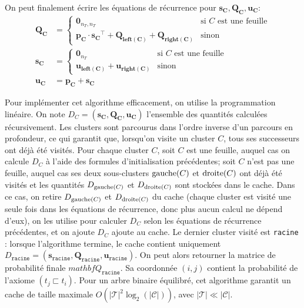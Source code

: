 On peut finalement écrire les équations de récurrence pour $\mathbf{s_C}, \mathbf{Q_C}, \mathbf{u_C}$:
\begin{align}
    \mathbf{Q_C} &=
    \begin{cases}
      \mathbf{0}_{n_T,n_T} & \text{si $C$ est une feuille}\\
      \mathbf{p_C} \cdot \mathbf{s_C}^\top + \mathbf{Q_\text{left$(C)$}} + \mathbf{Q_\text{right$(C)$}} & \text{sinon}
    \end{cases}  \\
  \mathbf{s_C} &=
    \begin{cases}
      \mathbf{0}_{n_T} & \text{si $C$ est une feuille}\\
      \mathbf{u_\text{left$(C)$}} + \mathbf{u_\text{right$(C)$}} & \text{sinon}
    \end{cases}  \\
    \mathbf{u_C} &= \mathbf{p_C} + \mathbf{s_C}
\end{align}

Pour implémenter cet algorithme efficacement, on utilise la programmation linéaire. On note $D_C = (\mathbf{s_C}, \mathbf{Q_C}, \mathbf{u_C})$ l'ensemble des quantités calculées récursivement. Les clusters sont parcourus dans l'ordre inverse d'un parcours en profondeur, ce qui garantit que, lorsqu'on visite un cluster $C$, tous ses successeurs ont déjà été visités. Pour chaque cluster $C$, soit $C$ est une feuille, auquel cas on calcule $D_C$ à l'aide des formules d'initialisation précédentes; soit $C$ n'est pas une feuille, auquel cas ses deux sous-clusters $\operatorname{gauche}(C)$ et $\operatorname{droite}(C)$ ont déjà été visités et les quantités $D_{\operatorname{gauche}(C)}$ et $D_{\operatorname{droite}(C)}$ sont stockées dans le cache. Dans ce cas, on retire $D_{\operatorname{gauche}(C)}$ et $D_{\operatorname{droite}(C)}$ du cache (chaque cluster est visité une seule fois dans les équations de récurrence, donc plus aucun calcul ne dépend d'eux), on les utilise pour calculer $D_C$ selon les équations de récurrence précédentes, et on ajoute $D_C$ ajoute au cache. Le dernier cluster visité est \texttt{racine} : lorsque l'algorithme termine, le cache contient uniquement $D_\texttt{racine} = (\mathbf{s_\texttt{racine}}, \mathbf{Q_\texttt{racine}}, \mathbf{u_\texttt{racine}})$. On peut alors retourner la matrice de probabilité finale $mathbf{Q_\texttt{racine}}$. Sa coordonnée $(i, j)$ contient la probabilité de l'axiome $(t_j \sqsubset t_i)$.
Pour un arbre binaire équilibré, cet algorithme garantit un cache de taille maximale $O(|\mathcal{T}|^2 \log_2(| \mathcal{C} |))$, avec $|\mathcal{T}| \ll | \mathcal{C} |$.


